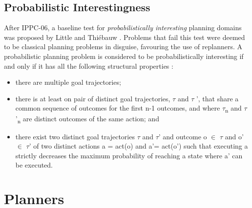 \documentclass[runningheads,a4paper]{llncs}
\begin{document}
\subsection{Probabilistic Interestingness}
After IPPC-06, a baseline test for \emph{probabilistically interesting} planning domains was proposed by Little and Thi\'ebauw \cite{little2007probvsreplan}.  Problems that fail this test were deemed to be classical planning problems in disguise, favouring the use of replanners. A probabilistic planning problem is considered to be probabilistically interesting if and only if it has all the following structural properties \cite{little2007probvsreplan}:

\begin{itemize}
	\item there are multiple goal trajectories;
	\item there is at least on pair of distinct goal trajectories, $\tau$ and $\tau$ ', that share a common sequence of outcomes for the first n-1 outcomes, and where $\tau$\textsubscript{n} and $\tau$'\textsubscript{n} are distinct outcomes of the same action; and
	\item there exist two distinct goal trajectories $\tau$ and $\tau$' and outcome o $\in$ $\tau$ and o' $\in$ $\tau$' of two distinct actions a = act(o) and a'= act(o') such that executing a strictly decreases the maximum probability of reaching a state where a' can be executed.
\end{itemize}

%



\section{Planners}
\label{sec:planners}
\end{document}
